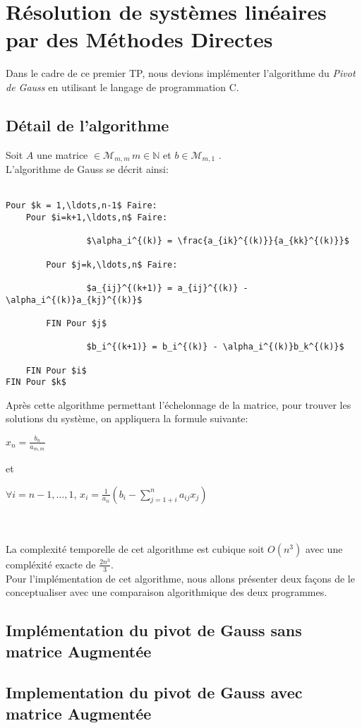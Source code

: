 \documentclass{report}
\begin{document}
\section{Résolution de systèmes linéaires par des Méthodes Directes}
Dans le cadre de ce premier TP, nous devions implémenter l'algorithme du \emph{Pivot de Gauss} en utilisant le langage de programmation C.
\subsection{Détail de l'algorithme}
Soit $A$ une matrice $ \in \mathcal{M}_{m,m}\,m \in \mathbb{N}$ et $b \in \mathcal{M}_{m,1}$ . \\
L'algorithme de Gauss se décrit ainsi: \\ \\
\begin{lstlisting}[mathescape=true]
Pour $k = 1,\ldots,n-1$ Faire:
	Pour $i=k+1,\ldots,n$ Faire:

				$\alpha_i^{(k)} = \frac{a_{ik}^{(k)}}{a_{kk}^{(k)}}$ 
		
		Pour $j=k,\ldots,n$ Faire:

		   		$a_{ij}^{(k+1)} = a_{ij}^{(k)} - \alpha_i^{(k)}a_{kj}^{(k)}$
	
		FIN Pour $j$

				$b_i^{(k+1)} = b_i^{(k)} - \alpha_i^{(k)}b_k^{(k)}$

	FIN Pour $i$
FIN Pour $k$
\end{lstlisting}
Après cette algorithme permettant l'échelonnage de la matrice, pour trouver les solutions du système, on appliquera la formule suivante: \\
\begin{Large}
$ x_n = \frac{b_n}{a_{m,m}}$ \\
\end{Large}
\Large{et} \\ 
\begin{Large}
$ \forall i = n-1, \ldots, 1$, $x_i = \frac{1}{a_{ii}}\left( b_i-\sum\limits_{j=1+i}^n a_{ij}x_j \right)$
\end{Large} \\ \\
\normalsize
La complexité temporelle de cet algorithme est cubique soit $O(n^3)$ avec une compléxité exacte de $\frac{2n^3}{3}$. \\
Pour l'implémentation de cet algorithme, nous allons présenter deux façons de le conceptualiser avec une comparaison algorithmique des deux programmes. \\
\subsection{Implémentation du pivot de Gauss sans matrice Augmentée}
% 
\subsection{Implementation du pivot de Gauss avec matrice Augmentée}
\end{document}
